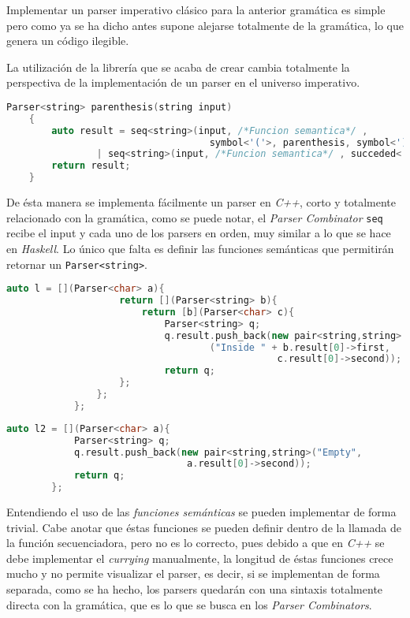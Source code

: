 	Implementar un parser imperativo clásico para la anterior gramática es simple pero como ya se ha dicho antes supone alejarse totalmente de la gramática, lo que genera un código ilegible.

	La utilización de la librería que se acaba de crear cambia totalmente la perspectiva de la implementación de un parser en el universo imperativo.
	
	\begin{lstlisting}[language=C++, caption=Utilización de los Parser combinators en C++]
	Parser<string> parenthesis(string input)
	{
		auto result = seq<string>(input, /*Funcion semantica*/ , 
									symbol<'('>, parenthesis, symbol<')'>) 
				| seq<string>(input, /*Funcion semantica*/ , succeded<'e'>);
		return result;
	}		
	\end{lstlisting}
	
	De ésta manera se implementa fácilmente un parser en \emph{C++}, corto y totalmente relacionado con la gramática, como se puede notar, el \emph{Parser Combinator} \texttt{seq} recibe el input y cada uno de los parsers en orden, muy similar a lo que se hace en \emph{Haskell}. Lo único que falta es definir las funciones semánticas que permitirán retornar un \texttt{Parser<string>}. 
	
	\begin{lstlisting}[language=C++]
		auto l = [](Parser<char> a){
					return [](Parser<string> b){
						return [b](Parser<char> c){
							Parser<string> q;
							q.result.push_back(new pair<string,string>
									("Inside " + b.result[0]->first, 
												c.result[0]->second));
							return q;
					};
				};
			};
	\end{lstlisting}
	\newpage
	\begin{lstlisting}[language=C++, caption=Funciones semánticas en C++]
		auto l2 = [](Parser<char> a){
			Parser<string> q;
			q.result.push_back(new pair<string,string>("Empty", 
								a.result[0]->second));
			return q;
		};		
	\end{lstlisting}
	
	Entendiendo el uso de las \emph{funciones semánticas} se pueden implementar de forma trivial. Cabe anotar que éstas funciones se pueden definir dentro de la llamada de la función secuenciadora, pero no es lo correcto, pues debido a que en \emph{C++} se debe implementar el \emph{currying} manualmente, la longitud de éstas funciones crece mucho y no permite visualizar el parser, es decir, si se implementan de forma separada, como se ha hecho, los parsers quedarán con una sintaxis totalmente directa con la gramática, que es lo que se busca en los \emph{Parser Combinators}.
	

